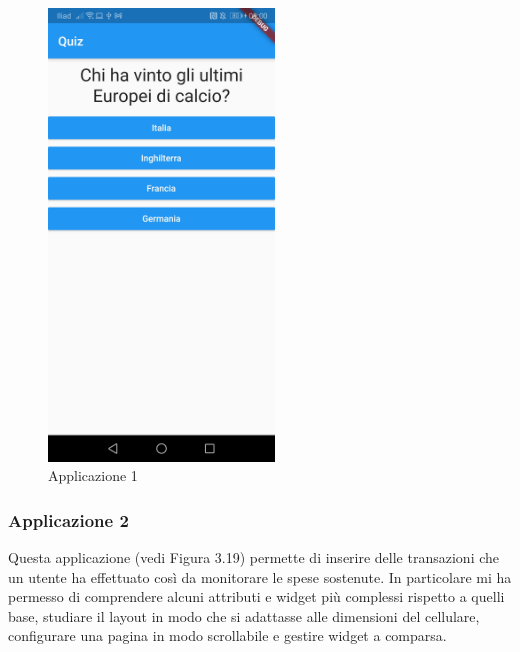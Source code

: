 \begin{figure}[htbp]	
	\centering
	\includegraphics[width=6cm]{immagini/app1.jpeg}
	\caption{Applicazione 1}
	\label{fig:Applicazione 1}
\end{figure}

\newpage

\subsubsection{Applicazione 2}
Questa applicazione (vedi Figura 3.19) permette di inserire delle transazioni che un utente ha effettuato così da monitorare le spese sostenute.
In particolare mi ha permesso di comprendere alcuni attributi e widget più complessi rispetto a quelli base, studiare il layout in modo che si adattasse alle dimensioni del cellulare, configurare una pagina in modo scrollabile e gestire widget a comparsa.\\

